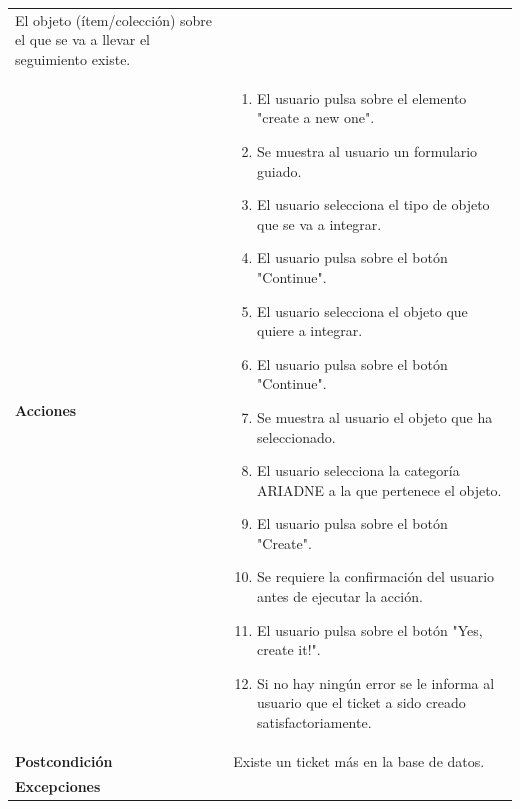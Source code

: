 \documentclass[
]{article}
\providecommand{\tightlist}{%
  \setlength{\itemsep}{0pt}\setlength{\parskip}{0pt}}
\begin{document}
\begin{longtable}[]{@{}ll@{}}
\begin{minipage}[t]{0.78\columnwidth}
El objeto (ítem/colección) sobre el que se va a llevar el seguimiento
existe.\strut
\end{minipage}\tabularnewline
\begin{minipage}[t]{0.16\columnwidth}\raggedright
\textbf{Acciones}\strut
\end{minipage} & \begin{minipage}[t]{0.78\columnwidth}\raggedright
\begin{enumerate}
\def\labelenumi{\arabic{enumi}.}
\tightlist
\item
  El usuario pulsa sobre el elemento "create a new one".
\item
  Se muestra al usuario un formulario guiado.
\item
  El usuario selecciona el tipo de objeto que se va a integrar.
\item
  El usuario pulsa sobre el botón "Continue".
\item
  El usuario selecciona el objeto que quiere a integrar.
\item
  El usuario pulsa sobre el botón "Continue".
\item
  Se muestra al usuario el objeto que ha seleccionado.
\item
  El usuario selecciona la categoría ARIADNE a la que pertenece el
  objeto.
\item
  El usuario pulsa sobre el botón "Create".
\item
  Se requiere la confirmación del usuario antes de ejecutar la acción.
\item
  El usuario pulsa sobre el botón "Yes, create it!".
\item
  Si no hay ningún error se le informa al usuario que el ticket a sido
  creado satisfactoriamente.
\end{enumerate}\strut
\end{minipage}\tabularnewline
\begin{minipage}[t]{0.16\columnwidth}\raggedright
\textbf{Postcondición}\strut
\end{minipage} & \begin{minipage}[t]{0.78\columnwidth}\raggedright
Existe un ticket más en la base de datos.\strut
\end{minipage}\tabularnewline
\begin{minipage}[t]{0.16\columnwidth}\raggedright
\textbf{Excepciones}\strut
\end{minipage} & \begin{minipage}[t]{0.78\columnwidth}\raggedright
\begin{itemize}

\end{itemize}
\end{minipage}
\end{longtable}
\end{document}
